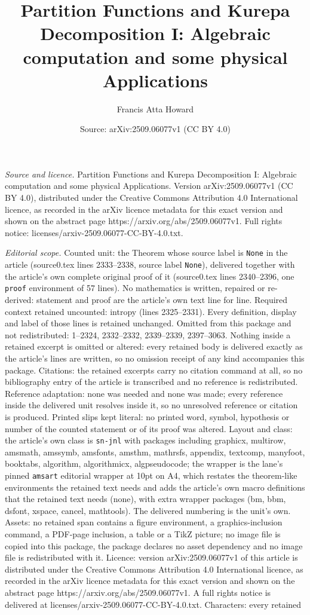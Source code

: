 \documentclass[10pt,a4paper]{amsart}
\title[Partition Functions and Kurepa Decomposition I: Algebraic co]{Partition Functions and Kurepa Decomposition I: Algebraic computation and some physical Applications}
\author{Francis Atta Howard}
\date{Source: arXiv:2509.06077v1 (CC BY 4.0)}
\begin{document}
\maketitle

\noindent\emph{Source and licence.} Partition Functions and Kurepa Decomposition I: Algebraic computation and some physical Applications. Version arXiv:2509.06077v1 (CC BY 4.0), distributed under the Creative Commons Attribution 4.0 International licence, as recorded in the arXiv licence metadata for this exact version and shown on the abstract page https://arxiv.org/abs/2509.06077v1. Full rights notice: licenses/arxiv-2509.06077-CC-BY-4.0.txt.\par\smallskip

\noindent\textit{Editorial scope.} Counted unit: the Theorem whose source label is \texttt{None} in the article (source0.tex lines 2333--2338, source label \texttt{None}), delivered together with the article's own complete original proof of it (source0.tex lines 2340--2396, one \texttt{proof} environment of 57 lines). No mathematics is written, repaired or re-derived: statement and proof are the article's own text line for line. Required context retained uncounted: intropy (lines 2325--2331). Every definition, display and label of those lines is retained unchanged. Omitted from this package and not redistributed: 1--2324, 2332--2332, 2339--2339, 2397--3063. Nothing inside a retained excerpt is omitted or altered: every retained body is delivered exactly as the article's lines are written, so no omission receipt of any kind accompanies this package. Citations: the retained excerpts carry no citation command at all, so no bibliography entry of the article is transcribed and no reference is redistributed. Reference adaptation: none was needed and none was made; every reference inside the delivered unit resolves inside it, so no unresolved reference or citation is produced. Printed slips kept literal: no printed word, symbol, hypothesis or number of the counted statement or of its proof was altered. Layout and class: the article's own class is \texttt{sn-jnl} with packages including graphicx, multirow, amsmath, amssymb, amsfonts, amsthm, mathrsfs, appendix, textcomp, manyfoot, booktabs, algorithm, algorithmicx, algpseudocode; the wrapper is the lane's pinned \texttt{amsart} editorial wrapper at 10pt on A4, which restates the theorem-like environments the retained text needs and adds the article's own macro definitions that the retained text needs (none), with extra wrapper packages (bm, bbm, dsfont, xspace, cancel, mathtools). The delivered numbering is the unit's own. Assets: no retained span contains a figure environment, a graphics-inclusion command, a PDF-page inclusion, a table or a TikZ picture; no image file is copied into this package, the package declares no asset dependency and no image file is redistributed with it. Licence: version arXiv:2509.06077v1 of this article is distributed under the Creative Commons Attribution 4.0 International licence, as recorded in the arXiv licence metadata for this exact version and shown on the abstract page https://arxiv.org/abs/2509.06077v1. A full rights notice is delivered at licenses/arxiv-2509.06077-CC-BY-4.0.txt. Characters: every retained 
\end{document}
